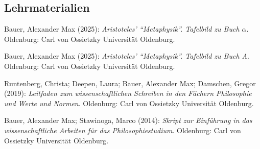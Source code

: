 \documentclass[a4paper,10pt]{article}
\newenvironment{literature}{%
   \parskip6pt\parindent0pt\raggedright
   \def\lititem{\hangindent=1cm\hangafter1}}{%
   \par\ignorespaces}
\begin{document}
\subsection*{Lehrmaterialien}
\begin{literature}
\lititem Bauer, Alexander Max (2025): \textit{Aristoteles' \enquote{Metaphysik}. Tafelbild zu Buch $\alpha$}. Oldenburg: Carl von Ossietzky Universität Oldenburg.

\lititem Bauer, Alexander Max (2025): \textit{Aristoteles' \enquote{Metaphysik}. Tafelbild zu Buch A}. Oldenburg: Carl von Ossietzky Universität Oldenburg.

\lititem Runtenberg, Christa; Deepen, Laura; Bauer, Alexander Max; Damschen, Gregor (2019): \textit{Leitfaden zum wissenschaftlichen Schreiben in den Fächern Philosophie und Werte und Normen}. Oldenburg: Carl von Ossietzky Universität Oldenburg.

\lititem Bauer, Alexander Max; Stawinoga, Marco (2014): \textit{Skript zur Einführung in das wissenschaftliche Arbeiten für das Philosophiestudium}. Oldenburg: Carl von Ossietzky Universität Oldenburg.
\end{literature}
\end{document}

